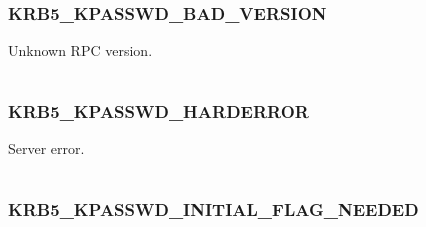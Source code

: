 \documentclass[letterpaper,10pt,english]{sphinxmanual}
\begin{document}
\subsubsection{KRB5\_KPASSWD\_BAD\_VERSION}
\label{appdev/refs/macros/KRB5_KPASSWD_BAD_VERSION:krb5-kpasswd-bad-version-data}\label{appdev/refs/macros/KRB5_KPASSWD_BAD_VERSION:krb5-kpasswd-bad-version}\label{appdev/refs/macros/KRB5_KPASSWD_BAD_VERSION::doc}

\begin{fulllineitems}
\label{appdev/refs/macros/KRB5_KPASSWD_BAD_VERSION:KRB5_KPASSWD_BAD_VERSION}
\end{fulllineitems}


Unknown RPC version.

\begin{tabulary}{\linewidth}{|L|L|}
\hline

 & 
\\\hline
\end{tabulary}



\subsubsection{KRB5\_KPASSWD\_HARDERROR}
\label{appdev/refs/macros/KRB5_KPASSWD_HARDERROR:krb5-kpasswd-harderror}\label{appdev/refs/macros/KRB5_KPASSWD_HARDERROR:krb5-kpasswd-harderror-data}\label{appdev/refs/macros/KRB5_KPASSWD_HARDERROR::doc}

\begin{fulllineitems}
\label{appdev/refs/macros/KRB5_KPASSWD_HARDERROR:KRB5_KPASSWD_HARDERROR}
\end{fulllineitems}


Server error.

\begin{tabulary}{\linewidth}{|L|L|}
\hline

 & 
\\\hline
\end{tabulary}



\subsubsection{KRB5\_KPASSWD\_INITIAL\_FLAG\_NEEDED}
\label{appdev/refs/macros/KRB5_KPASSWD_INITIAL_FLAG_NEEDED:krb5-kpasswd-initial-flag-needed}\label{appdev/refs/macros/KRB5_KPASSWD_INITIAL_FLAG_NEEDED::doc}\label{appdev/refs/macros/KRB5_KPASSWD_INITIAL_FLAG_NEEDED:krb5-kpasswd-initial-flag-needed-data}
\end{document}
